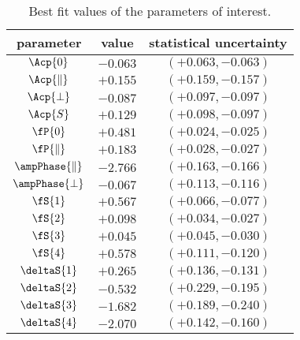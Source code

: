 \begin{table}[!h]
  \center
  \begin{tabular}{c c c}
    \hline
     parameter & value & statistical uncertainty \\
     \hline
     $             \Acp{0}$ & $-0.063$ & $(+0.063,-0.063)$ \\
     $     \Acp{\parallel}$ & $+0.155$ & $(+0.159,-0.157)$ \\
     $         \Acp{\perp}$ & $-0.087$ & $(+0.097,-0.097)$ \\
     $             \Acp{S}$ & $+0.129$ & $(+0.098,-0.097)$ \\
     \hline
     $              \fP{0}$ & $+0.481$ & $(+0.024,-0.025)$ \\
     $      \fP{\parallel}$ & $+0.183$ & $(+0.028,-0.027)$ \\
     $\ampPhase{\parallel}$ & $-2.766$ & $(+0.163,-0.166)$ \\
     $    \ampPhase{\perp}$ & $-0.067$ & $(+0.113,-0.116)$ \\
     \hline
     $              \fS{1}$ & $+0.567$ & $(+0.066,-0.077)$ \\
     $              \fS{2}$ & $+0.098$ & $(+0.034,-0.027)$ \\
     $              \fS{3}$ & $+0.045$ & $(+0.045,-0.030)$ \\
     $              \fS{4}$ & $+0.578$ & $(+0.111,-0.120)$ \\
     $          \deltaS{1}$ & $+0.265$ & $(+0.136,-0.131)$ \\
     $          \deltaS{2}$ & $-0.532$ & $(+0.229,-0.195)$ \\
     $          \deltaS{3}$ & $-1.682$ & $(+0.189,-0.240)$ \\
     $          \deltaS{4}$ & $-2.070$ & $(+0.142,-0.160)$ \\
    \hline
  \end{tabular}
  \caption{\small Best fit values of the parameters of interest.}
  \label{bestFitResult}
\end{table}


